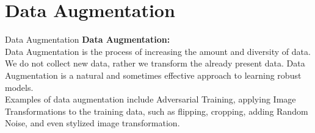 \documentclass[8pt]{beamer}
\begin{document}
\section{Data Augmentation}
\begin{frame}{Data Augmentation}
\textbf{Data Augmentation:}\\
\qquad Data Augmentation is the process of increasing the amount and diversity of data. We do not collect new data, rather we transform the already present data. Data Augmentation is a natural and sometimes effective approach to learning robust models.\\ \qquad Examples of data augmentation include Adversarial Training, applying Image Transformations to the training data, such as flipping, cropping, adding Random Noise, and even stylized image transformation.
\end{frame}
\end{document}
